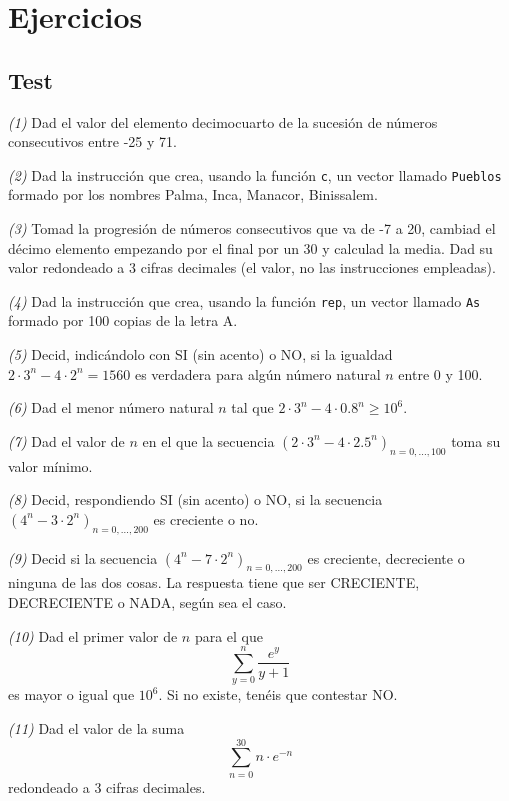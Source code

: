 \documentclass[
]{book}
\theoremstyle{definition}
\theoremstyle{definition}
\theoremstyle{definition}
\theoremstyle{remark}
\begin{document}
\hypertarget{ejercicios-2}{%
\section{Ejercicios}\label{ejercicios-2}}

\hypertarget{test-1}{%
\subsection*{Test}\label{test-1}}

\emph{(1)} Dad el valor del elemento decimocuarto de la sucesión de números consecutivos entre -25 y 71.

\emph{(2)} Dad la instrucción que crea, usando la función \texttt{c}, un vector llamado \texttt{Pueblos} formado por los nombres Palma, Inca, Manacor, Binissalem.

\emph{(3)} Tomad la progresión de números consecutivos que va de -7 a 20, cambiad el décimo elemento empezando por el final por un 30 y calculad la media. Dad su valor redondeado a 3 cifras decimales (el valor, no las instrucciones empleadas).

\emph{(4)} Dad la instrucción que crea, usando la función \texttt{rep}, un vector llamado \texttt{As} formado por 100 copias de la letra A.

\emph{(5)} Decid, indicándolo con SI (sin acento) o NO, si la igualdad \(2\cdot 3^n-4\cdot 2^n=1560\) es verdadera para algún número natural \(n\) entre 0 y 100.

\emph{(6)} Dad el menor número natural \(n\) tal que \(2\cdot 3^n-4\cdot 0.8^n\geqslant 10^6\).

\emph{(7)} Dad el valor de \(n\) en el que la secuencia \((2\cdot 3^n-4\cdot 2.5^n)_{n=0,\ldots,100}\) toma su valor mínimo.

\emph{(8)} Decid, respondiendo SI (sin acento) o NO, si la secuencia \((4^n-3\cdot 2^n)_{n=0,\ldots,200}\) es creciente o no.

\emph{(9)} Decid si la secuencia \((4^n-7\cdot 2^n)_{n=0,\ldots,200}\) es creciente, decreciente o ninguna de las dos cosas. La respuesta tiene que ser CRECIENTE, DECRECIENTE o NADA, según sea el caso.

\emph{(10)} Dad el primer valor de \(n\) para el que
\[
\sum_{y=0}^n \frac{e^y}{y+1}
\]
es mayor o igual que \(10^6\). Si no existe, tenéis que contestar NO.

\emph{(11)} Dad el valor de la suma
\[
\sum_{n=0}^{30} n\cdot e^{-n}
\]
redondeado a 3 cifras decimales.
\end{document}
